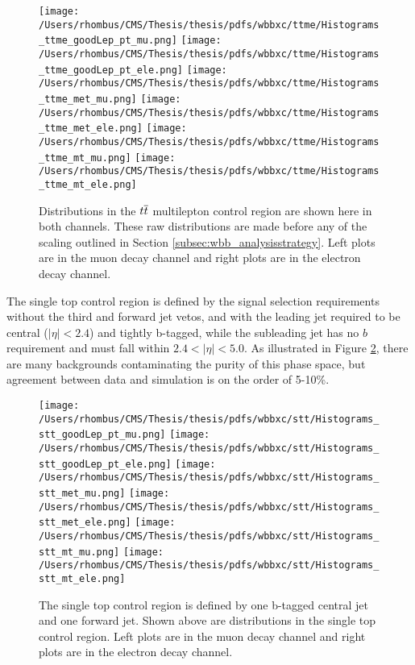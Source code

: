 \begin{figure}
      \caption[\ttbar-multilepton control region for the \wbb measurement]
    {Distributions in the $t\overline{t}$ multilepton control region are shown here in both channels.
       These raw distributions are made before any of the scaling outlined in Section \ref{subsec:wbb_analysisstrategy}.
       Left plots are in the muon decay channel and right
        plots are in the electron decay channel.
      }
      \center
\texttt{[image: /Users/rhombus/CMS/Thesis/thesis/pdfs/wbbxc/ttme/Histograms\_ttme\_goodLep\_pt\_mu.png]}
\texttt{[image: /Users/rhombus/CMS/Thesis/thesis/pdfs/wbbxc/ttme/Histograms\_ttme\_goodLep\_pt\_ele.png]}
\texttt{[image: /Users/rhombus/CMS/Thesis/thesis/pdfs/wbbxc/ttme/Histograms\_ttme\_met\_mu.png]}
\texttt{[image: /Users/rhombus/CMS/Thesis/thesis/pdfs/wbbxc/ttme/Histograms\_ttme\_met\_ele.png]}
\texttt{[image: /Users/rhombus/CMS/Thesis/thesis/pdfs/wbbxc/ttme/Histograms\_ttme\_mt\_mu.png]}
\texttt{[image: /Users/rhombus/CMS/Thesis/thesis/pdfs/wbbxc/ttme/Histograms\_ttme\_mt\_ele.png]}
      \label{fig:prefit_ttme}
\end{figure}

The single top control region is defined by the signal selection requirements
 without the third and forward jet vetos, and
 with the leading jet required to be central
 ($|\eta|<2.4$) and tightly b-tagged,
 while the subleading jet has no $b$ requirement and must fall within
 $2.4<|\eta|<5.0$.
As illustrated in Figure \ref{fig:prefit_stt}, there are many 
 backgrounds contaminating the purity of this phase space,
 but agreement between data and simulation is on the order of 5-10\%.
\begin{figure}
      \caption[Single-top control region for the \wbb measurement]{The single top control region is defined by one b-tagged central jet and one forward jet.
      Shown above are distributions in the single top control region.
       Left plots are in the muon decay channel and right
        plots are in the electron decay channel.
      }
      \center
 \texttt{[image: /Users/rhombus/CMS/Thesis/thesis/pdfs/wbbxc/stt/Histograms\_stt\_goodLep\_pt\_mu.png]}
 \texttt{[image: /Users/rhombus/CMS/Thesis/thesis/pdfs/wbbxc/stt/Histograms\_stt\_goodLep\_pt\_ele.png]}
 \texttt{[image: /Users/rhombus/CMS/Thesis/thesis/pdfs/wbbxc/stt/Histograms\_stt\_met\_mu.png]}
 \texttt{[image: /Users/rhombus/CMS/Thesis/thesis/pdfs/wbbxc/stt/Histograms\_stt\_met\_ele.png]}
 \texttt{[image: /Users/rhombus/CMS/Thesis/thesis/pdfs/wbbxc/stt/Histograms\_stt\_mt\_mu.png]}
 \texttt{[image: /Users/rhombus/CMS/Thesis/thesis/pdfs/wbbxc/stt/Histograms\_stt\_mt\_ele.png]}
      \label{fig:prefit_stt}
\end{figure}



